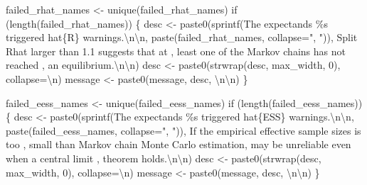 \documentclass[
  letterpaper,
  DIV=11,
  numbers=noendperiod]{scrartcl}
\newenvironment{Shaded}{\begin{snugshade}}{\end{snugshade}}
\newcommand{\AttributeTok}[1]{\textcolor[rgb]{0.40,0.45,0.13}{#1}}
\newcommand{\ControlFlowTok}[1]{\textcolor[rgb]{0.00,0.23,0.31}{#1}}
\newcommand{\DecValTok}[1]{\textcolor[rgb]{0.68,0.00,0.00}{#1}}
\newcommand{\FunctionTok}[1]{\textcolor[rgb]{0.28,0.35,0.67}{#1}}
\newcommand{\NormalTok}[1]{\textcolor[rgb]{0.00,0.23,0.31}{#1}}
\newcommand{\OtherTok}[1]{\textcolor[rgb]{0.00,0.23,0.31}{#1}}
\newcommand{\SpecialCharTok}[1]{\textcolor[rgb]{0.37,0.37,0.37}{#1}}
\newcommand{\StringTok}[1]{\textcolor[rgb]{0.13,0.47,0.30}{#1}}
\begin{document}
\begin{Shaded}
\begin{Highlighting}[]
\NormalTok{  failed\_rhat\_names }\OtherTok{\textless{}{-}} \FunctionTok{unique}\NormalTok{(failed\_rhat\_names)}
  \ControlFlowTok{if}\NormalTok{ (}\FunctionTok{length}\NormalTok{(failed\_rhat\_names)) \{}
\NormalTok{    desc }\OtherTok{\textless{}{-}} 
      \FunctionTok{paste0}\NormalTok{(}\FunctionTok{sprintf}\NormalTok{(}\StringTok{\textquotesingle{}The expectands \%s triggered hat\{R\} warnings.}\SpecialCharTok{\textbackslash{}n\textbackslash{}n}\StringTok{\textquotesingle{}}\NormalTok{,}
             \FunctionTok{paste}\NormalTok{(failed\_rhat\_names, }\AttributeTok{collapse=}\StringTok{", "}\NormalTok{)),}
             \StringTok{\textquotesingle{}  Split Rhat larger than 1.1 suggests that at \textquotesingle{}}\NormalTok{,}
             \StringTok{\textquotesingle{}least one of the Markov chains has not reached \textquotesingle{}}\NormalTok{,}
             \StringTok{\textquotesingle{}an equilibrium.}\SpecialCharTok{\textbackslash{}n\textbackslash{}n}\StringTok{\textquotesingle{}}\NormalTok{)}
\NormalTok{    desc }\OtherTok{\textless{}{-}} \FunctionTok{paste0}\NormalTok{(}\FunctionTok{strwrap}\NormalTok{(desc, max\_width, }\DecValTok{0}\NormalTok{), }\AttributeTok{collapse=}\StringTok{\textquotesingle{}}\SpecialCharTok{\textbackslash{}n}\StringTok{\textquotesingle{}}\NormalTok{)}
\NormalTok{    message }\OtherTok{\textless{}{-}} \FunctionTok{paste0}\NormalTok{(message, desc, }\StringTok{\textquotesingle{}}\SpecialCharTok{\textbackslash{}n\textbackslash{}n}\StringTok{\textquotesingle{}}\NormalTok{)}
\NormalTok{  \}}
  
\NormalTok{  failed\_eess\_names }\OtherTok{\textless{}{-}} \FunctionTok{unique}\NormalTok{(failed\_eess\_names)}
  \ControlFlowTok{if}\NormalTok{ (}\FunctionTok{length}\NormalTok{(failed\_eess\_names)) \{}
\NormalTok{    desc }\OtherTok{\textless{}{-}} 
      \FunctionTok{paste0}\NormalTok{(}\FunctionTok{sprintf}\NormalTok{(}\StringTok{\textquotesingle{}The expectands \%s triggered hat\{ESS\} warnings.}\SpecialCharTok{\textbackslash{}n\textbackslash{}n}\StringTok{\textquotesingle{}}\NormalTok{,}
             \FunctionTok{paste}\NormalTok{(failed\_eess\_names, }\AttributeTok{collapse=}\StringTok{", "}\NormalTok{)),}
             \StringTok{\textquotesingle{}  If the empirical effective sample sizes is too \textquotesingle{}}\NormalTok{,}
             \StringTok{\textquotesingle{}small than Markov chain Monte Carlo estimation\textquotesingle{}}\NormalTok{,}
             \StringTok{\textquotesingle{}may be unreliable even when a central limit \textquotesingle{}}\NormalTok{,}
             \StringTok{\textquotesingle{}theorem holds.}\SpecialCharTok{\textbackslash{}n\textbackslash{}n}\StringTok{\textquotesingle{}}\NormalTok{)}
\NormalTok{    desc }\OtherTok{\textless{}{-}} \FunctionTok{paste0}\NormalTok{(}\FunctionTok{strwrap}\NormalTok{(desc, max\_width, }\DecValTok{0}\NormalTok{), }\AttributeTok{collapse=}\StringTok{\textquotesingle{}}\SpecialCharTok{\textbackslash{}n}\StringTok{\textquotesingle{}}\NormalTok{)}
\NormalTok{    message }\OtherTok{\textless{}{-}} \FunctionTok{paste0}\NormalTok{(message, desc, }\StringTok{\textquotesingle{}}\SpecialCharTok{\textbackslash{}n\textbackslash{}n}\StringTok{\textquotesingle{}}\NormalTok{)}
\NormalTok{  \}}
  

\end{Highlighting}
\end{Shaded}
\end{document}

